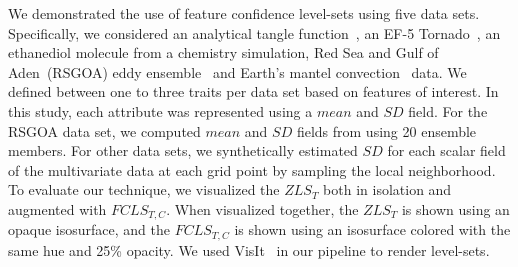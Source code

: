 %



%
We demonstrated the use of feature confidence level-sets using five data sets.
%
Specifically, we considered an analytical tangle function~\cite{knoll2009fast}, an EF-5 Tornado~\cite{atmos10100578}, an ethanediol molecule from a chemistry simulation, Red Sea and Gulf of Aden~(RSGOA) eddy ensemble~\cite{sanikommu2020impact} and Earth's mantel convection~\cite{shahnas2017mid} data.
%
We defined between one to three traits per data set based on features of interest. 
%
%
In this study, each attribute was represented using a $mean$ and $SD$ field. 
%
For the RSGOA data set, we computed $mean$ and $SD$ fields from using 20 ensemble members. 
%
For other data sets, we synthetically estimated $SD$ for each scalar field of the multivariate data at each grid point by sampling the local neighborhood.
%
To evaluate our technique, we visualized the $ZLS_{T}$ both in isolation and augmented with $FCLS_{T,C}$. 
%
When visualized together, the $ZLS_{T}$ is shown using an opaque isosurface, and the $FCLS_{T,C}$ is shown using an isosurface colored with the same hue and 25\% opacity.
%
We used VisIt~\cite{childs2012visit} in our pipeline to render level-sets.

%

